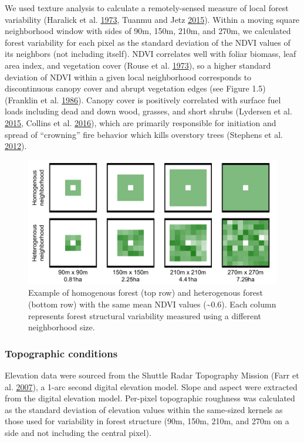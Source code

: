 \documentclass[twoside,12pt,final]{ucthesis-CA2012}
\begin{document}
\begin{ucmainmatter}
We used texture analysis to calculate a remotely-sensed measure of local
forest variability (Haralick et al.
\protect\hyperlink{ref-haralick1973}{1973}, Tuanmu and Jetz
\protect\hyperlink{ref-tuanmu2015}{2015}). Within a moving square
neighborhood window with sides of 90m, 150m, 210m, and 270m, we
calculated forest variability for each pixel as the standard deviation
of the NDVI values of its neighbors (not including itself). NDVI
correlates well with foliar biomass, leaf area index, and vegetation
cover (Rouse et al. \protect\hyperlink{ref-rouse1973}{1973}), so a
higher standard deviation of NDVI within a given local neighborhood
corresponds to discontinuous canopy cover and abrupt vegetation edges
(see Figure 1.5) (Franklin et al.
\protect\hyperlink{ref-franklin1986}{1986}). Canopy cover is positively
correlated with surface fuel loads including dead and down wood,
grasses, and short shrubs (Lydersen et al.
\protect\hyperlink{ref-lydersen2015}{2015}, Collins et al.
\protect\hyperlink{ref-collins2016}{2016}), which are primarily
responsible for initiation and spread of ``crowning'' fire behavior
which kills overstory trees (Stephens et al.
\protect\hyperlink{ref-stephens2012a}{2012}).
\begin{figure}
\centering
\includegraphics[width=6.00000in]{figure/chap01/heterogeneity-demo-raster.png}
\caption{Example of homogenous forest (top row) and heterogenous forest
(bottom row) with the same mean NDVI values (\textasciitilde{}0.6). Each
column represents forest structural variability measured using a
different neighborhood size. \label{fig-heterogeneity-raster}}
\end{figure}
\subsubsection{Topographic conditions}\label{topographic-conditions}

Elevation data were sourced from the Shuttle Radar Topography Mission
(Farr et al. \protect\hyperlink{ref-farr2007}{2007}), a 1-arc second
digital elevation model. Slope and aspect were extracted from the
digital elevation model. Per-pixel topographic roughness was calculated
as the standard deviation of elevation values within the same-sized
kernels as those used for variability in forest structure (90m, 150m,
210m, and 270m on a side and not including the central pixel).


\end{ucmainmatter}
\end{document}
